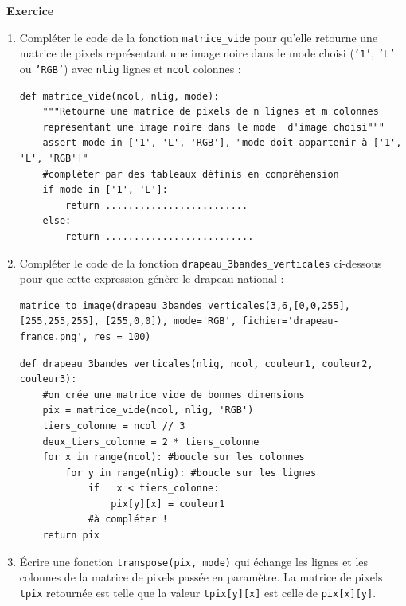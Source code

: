 \documentclass[a4paper, french, 12pt]{article}
\newcounter{exo}
\newenvironment{exercice}[1]
{\par \medskip   \addtocounter{exo}{1} \noindent  
\begin{bclogo}[arrondi =0.1,   noborder = true, logo=\bccrayon, marge=4]{~\textbf{Exercice} \textbf{\theexo} {\itshape #1} }  \par}
{
\end{bclogo}
 \par \bigskip }
\newcounter{def}
\begin{document}
\begin{exercice}{}




\begin{enumerate}
 \item Compléter le code de la fonction \texttt{matrice\_vide} pour qu'elle retourne une matrice de pixels représentant une image noire dans le mode choisi (\texttt{'1'}, \texttt{'L'} ou \texttt{'RGB'}) avec \texttt{nlig} lignes et \texttt{ncol} colonnes :

\begin{lstlisting}[style=rond]
def matrice_vide(ncol, nlig, mode):
    """Retourne une matrice de pixels de n lignes et m colonnes
    représentant une image noire dans le mode  d'image choisi"""
    assert mode in ['1', 'L', 'RGB'], "mode doit appartenir à ['1', 'L', 'RGB']"
    #compléter par des tableaux définis en compréhension
    if mode in ['1', 'L']:
        return .........................
    else:               
        return ..........................
\end{lstlisting}

	\item Compléter le code de la fonction \texttt{drapeau\_3bandes\_verticales} ci-dessous pour que cette expression génère le drapeau national :

\begin{lstlisting}[style=compil]
matrice_to_image(drapeau_3bandes_verticales(3,6,[0,0,255],[255,255,255], [255,0,0]), mode='RGB', fichier='drapeau-france.png', res = 100)
\end{lstlisting}


\begin{lstlisting}[style=rond]
def drapeau_3bandes_verticales(nlig, ncol, couleur1, couleur2, couleur3):
    #on crée une matrice vide de bonnes dimensions
    pix = matrice_vide(ncol, nlig, 'RGB')
    tiers_colonne = ncol // 3
    deux_tiers_colonne = 2 * tiers_colonne
    for x in range(ncol): #boucle sur les colonnes
        for y in range(nlig): #boucle sur les lignes
            if   x < tiers_colonne:
                pix[y][x] = couleur1
            #à compléter !
    return pix
\end{lstlisting}

   \item Écrire une fonction \texttt{transpose(pix, mode)} qui échange les lignes et les colonnes de la matrice de pixels passée en paramètre. La matrice de pixels \texttt{tpix} retournée est  telle que la valeur \texttt{tpix[y][x]} est celle de \texttt{pix[x][y]}.



\end{enumerate}
\end{exercice}
\end{document}
